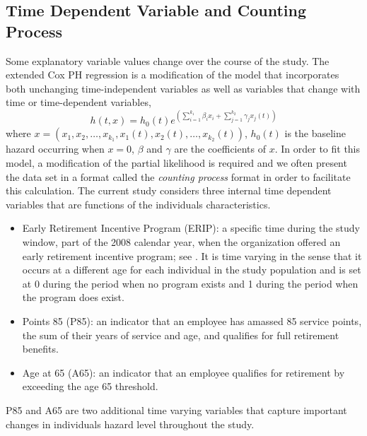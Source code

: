 \documentclass[12pt,letterpaper]{article}
\begin{document}
\subsection{Time Dependent Variable and Counting Process}
\label{sec:coxt}
Some explanatory variable values change over the course of the study. The extended Cox PH regression is a modification of the model that incorporates both unchanging time-independent variables as well as variables that change with time or time-dependent variables,
\begin{equation}
	\label{eq:timecovar}
	h(t,x)=h_0(t)e^{(\sum_{i=1}^{k_1}\beta_ix_i+\sum_{j=1}^{k_2}\gamma_jx_j(t))}
\end{equation}
where $x=(x_1, x_2, \ldots, x_{k_1}, x_1(t), x_2(t), \ldots, x_{k_2}(t))$, $h_0(t)$ is the baseline hazard occurring when $x=0$, $\beta$ and $\gamma$ are the coefficients of $x$. In order to fit this model, a modification of the partial likelihood is required and we often present the data set in a format called the {\it counting process} format in order to facilitate this calculation. The current study considers three internal time dependent variables that are functions of the individuals characteristics.
\begin{itemize}
\item Early Retirement Incentive Program (ERIP): a specific time during the study window, part of the 2008 calendar year, when the organization offered an early retirement incentive program; see \citep{ERIP}. It is time varying in the sense that it occurs at a different age for each individual in the study population and is set at 0 during the period when no program exists and 1 during the period when the program does exist.
\item Points 85 (P85): an indicator that an employee has amassed 85 service points, the sum of their years of service and age, and qualifies for full retirement benefits.
\item Age at 65 (A65): an indicator that an employee qualifies for retirement by exceeding the age 65 threshold.
\end{itemize}
P85 and A65 are two additional time varying variables that capture important changes in individuals hazard level throughout the study.

\end{document}
